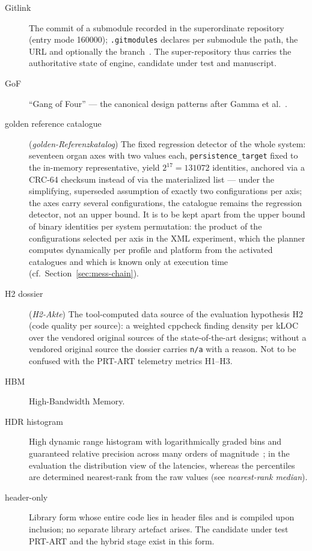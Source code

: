 \begin{description}
  \item[Gitlink] The commit of a submodule recorded in the superordinate repository (entry mode
  160000); \texttt{.gitmodules} declares per submodule the path, the URL and optionally the
  branch~\cite{git2026gitmodules}. The super-repository thus carries the authoritative state of
  engine, candidate under test and manuscript.
  \item[GoF] \enquote{Gang of Four} --- the canonical design patterns after Gamma et
  al.~\cite{gamma1994patterns}.
  \item[golden reference catalogue] (\emph{golden-Referenzkatalog}) The fixed regression detector
  of the whole system: seventeen organ axes with two values each, \texttt{persistence\_target}
  fixed to the in-memory representative, yield $2^{17} = 131072$ identities, anchored via a CRC-64
  checksum instead of via the materialized list --- under the simplifying, superseded assumption of exactly
  two configurations per axis; the axes carry several configurations, the catalogue remains the regression
  detector, not an upper bound. It is to be kept apart from the upper bound of binary identities per system
  permutation: the product of the configurations selected per axis in the XML experiment, which the planner
  computes dynamically per profile and platform from the activated catalogues and which is known only at
  execution time (cf.\ Section~\ref{sec:mess-chain}).
  \item[H2 dossier] (\emph{H2-Akte}) The tool-computed data source of the evaluation hypothesis H2
  (code quality per source): a weighted cppcheck finding density per kLOC over the vendored
  original sources of the state-of-the-art designs; without a vendored original source the dossier
  carries \texttt{n/a} with a reason. Not to be confused with the PRT-ART telemetry metrics
  H1--H3.
  \item[HBM] High-Bandwidth Memory.
  \item[HDR histogram] High dynamic range histogram with logarithmically graded bins and
  guaranteed relative precision across many orders of magnitude~\cite{tene_hdrhistogram}; in the
  evaluation the distribution view of the latencies, whereas the percentiles are determined
  nearest-rank from the raw values (see \emph{nearest-rank median}).
  \item[header-only] Library form whose entire code lies in header files and is compiled upon
  inclusion; no separate library artefact arises. The candidate under test PRT-ART and the hybrid stage exist in
  this form.

\end{description}
